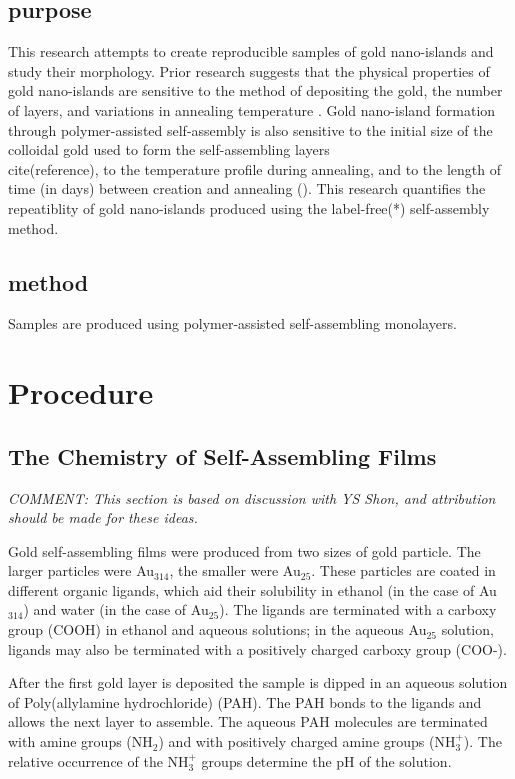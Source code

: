 \documentclass[12pt,oneside,english]{article}
\begin{document}
	\subsection{purpose}
	This research attempts to create reproducible samples of gold nano-islands and study their morphology.
	Prior research suggests that the physical properties of gold nano-islands are sensitive to the method of depositing the gold, the number of layers, and variations in annealing temperature \cite{shon07}.  
	Gold nano-island formation through polymer-assisted self-assembly is also sensitive to the initial size of the colloidal gold used to form the self-assembling layers \\cite(reference), to the temperature profile during annealing, and to the length of time (in days) between creation and annealing (\cite{joshi}).
	This research quantifies the repeatiblity of gold nano-islands produced using the label-free(*) self-assembly method.
	\subsection{method}
	Samples are produced using polymer-assisted self-assembling monolayers.

	\section{Procedure}

	\subsection{The Chemistry of Self-Assembling Films}
	
	\emph{COMMENT: This section is based on discussion with YS Shon, and attribution should be made for these ideas.}
	
	Gold self-assembling films were produced from two sizes of gold particle.  
	The larger particles were Au$_{314}$, the smaller were Au$_{25}$.  
	These particles are coated in different organic ligands, which aid their solubility in ethanol (in the case of Au$_{314}$) and water (in the case of Au$_{25}$).    
	The ligands are terminated with a carboxy group (COOH) in ethanol and aqueous solutions; in the aqueous Au$_{25}$ solution, ligands may also be terminated with a positively charged carboxy group (COO-). 
	
	After the first gold layer is deposited the sample is dipped in an aqueous solution of Poly(allylamine hydrochloride) (PAH).  
	The PAH bonds to the ligands and allows the next layer to assemble.  	
	The aqueous PAH molecules are terminated with amine groups (NH$_2$) and with positively charged amine groups (NH$_3^+$).  
	The relative occurrence of the NH$_3^+$ groups determine the pH of the solution.
	
\end{document}
